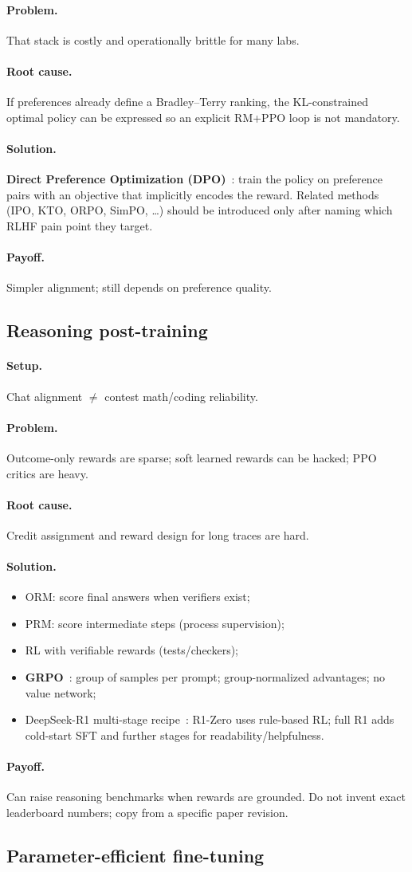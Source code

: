 \documentclass[11pt,a4paper]{article}
\newcommand{\layer}[1]{\paragraph{#1.}}
\newcommand{\setup}{\layer{Setup}}
\newcommand{\problem}{\layer{Problem}}
\newcommand{\rootcause}{\layer{Root cause}}
\newcommand{\solution}{\layer{Solution}}
\newcommand{\payoff}{\layer{Payoff}}
\begin{document}
\problem
That stack is costly and operationally brittle for many labs.

\rootcause
If preferences already define a Bradley--Terry ranking, the KL-constrained optimal policy can be expressed so an explicit RM+PPO loop is not mandatory.

\solution
\textbf{Direct Preference Optimization (DPO)}~\cite{rafailov2023dpo}: train the policy on preference pairs with an objective that implicitly encodes the reward.
Related methods (IPO, KTO, ORPO, SimPO, \ldots) should be introduced only after naming which RLHF pain point they target.

\payoff
Simpler alignment; still depends on preference quality.

\subsection{Reasoning post-training}
\label{sec:reasoning}

\setup
Chat alignment \(\neq\) contest math/coding reliability.

\problem
Outcome-only rewards are sparse; soft learned rewards can be hacked; PPO critics are heavy.

\rootcause
Credit assignment and reward design for long traces are hard.

\solution
\begin{itemize}[leftmargin=*]
  \item ORM: score final answers when verifiers exist;
  \item PRM: score intermediate steps (process supervision);
  \item RL with verifiable rewards (tests/checkers);
  \item \textbf{GRPO}~\cite{shao2024deepseekmath}: group of samples per prompt; group-normalized advantages; no value network;
  \item DeepSeek-R1 multi-stage recipe~\cite{deepseekr12025}: R1-Zero uses rule-based RL; full R1 adds cold-start SFT and further stages for readability/helpfulness.
\end{itemize}

\payoff
Can raise reasoning benchmarks when rewards are grounded.
Do not invent exact leaderboard numbers; copy from a specific paper revision.

\subsection{Parameter-efficient fine-tuning}
\label{sec:peft}
\end{document}
